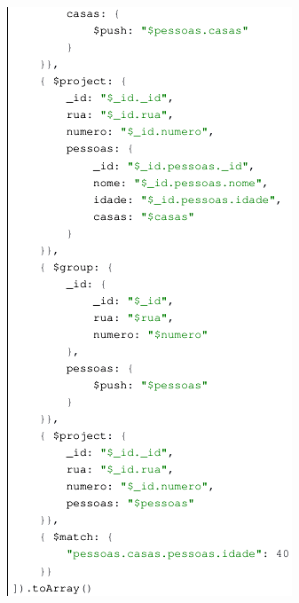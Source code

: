 \documentclass{beamer} %
\begin{document}
\begin{frame}
\begin{columns}
    \begin{figure}
        \centering
        \includegraphics[height=\textheight]{imagens/query-lookup-part-2.png}
        \label{fig:query-lookup-part-2}
    \end{figure}
\end{columns}
\end{frame}


    
    
\end{document}
